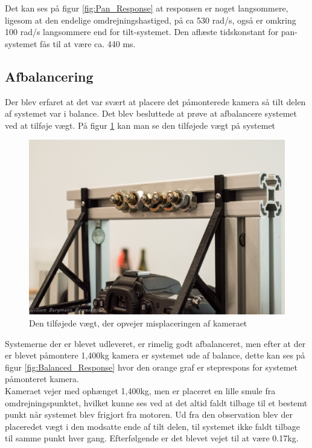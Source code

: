 Det kan ses på figur \ref{fig:Pan_Response} at responsen er noget langsommere, ligesom at den endelige omdrejningshastiged, på ca 530 rad/s, også er omkring 100 rad/s langsommere end for tilt-systemet. Den aflæste tidskonstant for pan-systemet fås til at være ca. 440 ms.

\subsection{Afbalancering}

Der blev erfaret at det var svært at placere det påmonterede kamera så tilt delen af systemet var i balance. Det blev besluttede at prøve at afbalancere systemet ved at tilføje vægt. På figur \ref{fig:Afbalancering} kan man se den tilføjede vægt på systemet

\begin{figure}[!hb]
	\begin{center}
		\includegraphics[scale=0.1]{Billeder/Afbalancering.jpg}
		\caption{Den tilføjede vægt, der opvejer misplaceringen af kameraet}
		\label{fig:Afbalancering}
	\end{center}
\end{figure}

Systemerne der er blevet udleveret, er rimelig godt afbalanceret, men efter at der er blevet påmontere 1,400kg kamera er systemet ude af balance, dette kan ses på figur \ref{fig:Balanced_Response} hvor den orange graf er steprespons for systemet påmonteret kamera.\\

Kameraet vejer med ophænget 1,400kg, men er placeret en lille smule fra omdrejningspunktet, hvilket kunne ses ved at det altid faldt tilbage til et bestemt punkt når systemet blev frigjort fra motoren.
Ud fra den observation blev der placeredet vægt i den modsatte ende af tilt delen, til systemet ikke faldt tilbage til samme punkt hver gang. Efterfølgende er det blevet vejet til at være 0.17kg.

